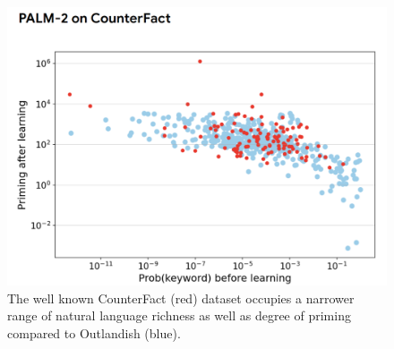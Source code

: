 \documentclass[11pt, a4paper, logo, copyright]{googledeepmind}
\theoremstyle{plain}
\theoremstyle{definition}
\theoremstyle{remark}
\begin{document}
\begin{figure}[h]
\vspace{0mm}
    \centering \includegraphics[scale=.35,clip]{figures/Counterfact.png}
    \vspace{-1mm}
    \caption{The well known CounterFact (red) dataset occupies a narrower range of natural language richness as well as degree of priming compared to Outlandish (blue).} \label{fig:Counterfact}
  \vspace{-0mm}
\end{figure}
\end{document}
